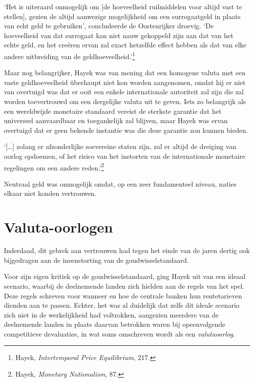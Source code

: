 \documentclass[
  a5paper,
  smalldemyvopaper,11pt,twoside,onecolumn,openright,extrafontsizes,
hidelinks]{memoir}
\renewenvironment{quote}%
               {\list{}{\rightmargin=.3cm\leftmargin=.3cm}%
                \itshape \item[]}%
               {\endlist}
\begin{document}
`Het is uiteraard onmogelijk om {[}de hoeveelheid ruilmiddelen voor
altijd vast te stellen{]}, gezien de altijd aanwezige mogelijkheid om
een surrogaatgeld in plaats van echt geld te gebruiken', concludeerde de
Oostenrijker droevig. `De hoeveelheid van dat surrogaat kan niet nauw
gekoppeld zijn aan dat van het echte geld, en het creëren ervan zal
exact hetzelfde effect hebben als dat van elke andere uitbreiding van de
geldhoeveelheid.'\footnote{\hspace{0pt}Hayek, \emph{Intertemporal Price
  Equilibrium}, 217.}

Maar nog belangrijker, Hayek was van mening dat een homogene valuta met
een vaste geldhoeveelheid überhaupt niet kon worden aangenomen, omdat
hij er niet van overtuigd was dat er ooit een enkele internationale
autoriteit zal zijn die zal worden toevertrouwd om een dergelijke valuta
uit te geven. Iets zo belangrijk als een wereldwijde monetaire standaard
vereist de sterkste garantie dat het universeel aanvaardbaar en
toegankelijk zal blijven, maar Hayek was ervan overtuigd dat er geen
bekende instantie was die deze garantie zou kunnen bieden.

\begin{quote}
`{[}\ldots{]} zolang er afzonderlijke soevereine staten zijn, zal er
altijd de dreiging van oorlog opdoemen, of het risico van het instorten
van de internationale monetaire regelingen om een andere
reden.'\footnote{\hspace{0pt}Hayek, \emph{Monetary Nationalism}, 87.}
\end{quote}

Neutraal geld was onmogelijk omdat, op een zeer fundamenteel niveau,
naties elkaar niet konden vertrouwen.

\section{Valuta-oorlogen}\label{valuta-oorlogen}

Inderdaad, dit gebrek aan vertrouwen had tegen het einde van de jaren
dertig ook bijgedragen aan de ineenstorting van de goudwisselstandaard.

Voor zijn eigen kritiek op de goudwisselstandaard, ging Hayek uit van
een ideaal scenario, waarbij de deelnemende landen zich hielden aan de
regels van het spel. Deze regels schreven voor wanneer en hoe de
centrale banken hun rentetarieven dienden aan te passen. Echter, het was
al duidelijk dat zelfs dit ideale scenario zich niet in de werkelijkheid
had voltrokken, aangezien meerdere van de deelnemende landen in plaats
daarvan betrokken waren bij opeenvolgende competitieve devaluaties, in
wat soms omschreven wordt als een \emph{valutaoorlog}.
\end{document}
